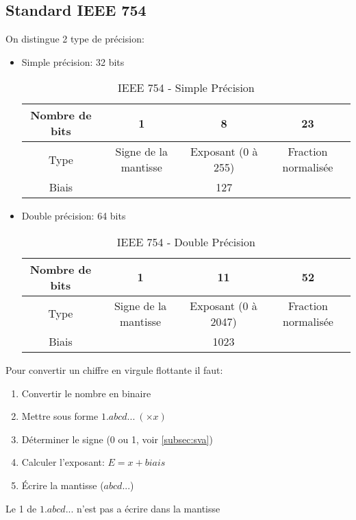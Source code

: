 \subsection{Standard IEEE 754}
On distingue 2 type de précision:
\begin{itemize}
	\item Simple précision: 32 bits\\
	\begin{table}[H]
		\centering
		\begin{tabular}{|c|c|c|c|}
			\hline
			Nombre de bits & 1 & 8 & 23\\
			\hline
			Type & Signe de la mantisse & Exposant (0 à 255) & Fraction normalisée\\
			\hline
			Biais & & 127 &\\
			\hline
		\end{tabular}
		\caption{IEEE 754 - Simple Précision}
	\end{table}
	\item Double précision: 64 bits\\
	\begin{table}[H]
		\centering
		\begin{tabular}{|c|c|c|c|}
			\hline
			Nombre de bits & 1 & 11 & 52\\
			\hline
			Type & Signe de la mantisse & Exposant (0 à 2047) & Fraction normalisée\\
			\hline
			Biais & & 1023 &\\
			\hline
		\end{tabular}
		\caption{IEEE 754 - Double Précision}
	\end{table}
\end{itemize}
Pour convertir un chiffre en virgule flottante il faut:
\begin{enumerate}
	\item Convertir le nombre en binaire
	\item Mettre sous forme $1.abcd...\ (\times x)$
	\item Déterminer le signe (0 ou 1, voir \autoref{subsec:sva})
	\item Calculer l'exposant: $E=x+biais$
	\item Écrire la mantisse ($abcd...$) 
\end{enumerate}
\danger Le 1 de $1.abcd...$ n'est pas a écrire dans la mantisse